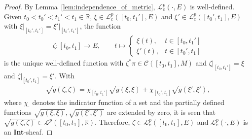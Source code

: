 \documentclass[preprint,12pt]{elsarticle}
\theoremstyle{definition}
\begin{document}
\begin{proof}
By Lemma~\ref{lem:independence_of_metric}, $\mathcal{L}_c^p(\cdot,E)$ is well-defined. Given $t_0<t_0'<t_1'<t_1\in\mathbb{R}$, $\xi\in\mathcal{L}_c^p([t_0,t_1'],E)$ and $\xi'\in\mathcal{L}_c^p([t_0',t_1],E)$ with $\xi\vert_{[t_0',t_1']} = \xi'\vert_{[t_0',t_1']}$, the function
\begin{align*}
\zeta: [t_0,t_1]\to E,\qquad t\mapsto\begin{cases}
\xi(t), & t\in[t_0,t_1']\\
\xi'(t), & t\in[t_0',t_1]
\end{cases}
\end{align*}
is the unique well-defined function with $\zeta^*\pi\in\mathcal{C}([t_0,t_1],M)$ and $\zeta\vert_{[t_0,t_1']} = \xi$ and $\zeta\vert_{[t_0',t_1]} = \xi'$. With
\begin{align*}
\sqrt{g(\zeta,\zeta)} = \chi_{[t_0,t_1']}\sqrt{g(\xi,\xi)}+\chi_{[t_0',t_1]}\sqrt{g(\xi',\xi')},
\end{align*}
where $\chi_\cdot$ denotes the indicator function of a set and the partially defined functions $\sqrt{g(\xi,\xi)},\sqrt{g(\xi',\xi')}$ are extended by zero, it is seen that $\sqrt{g(\zeta,\zeta)}\in\mathcal{L}^p([t_0,t_1],\mathbb{R})$. Therefore, $\zeta\in\mathcal{L}_c^p([t_0,t_1],E)$ and $\mathcal{L}_c^p(\cdot,E)$ is an \textbf{Int}-sheaf.


\end{proof}
\end{document}
